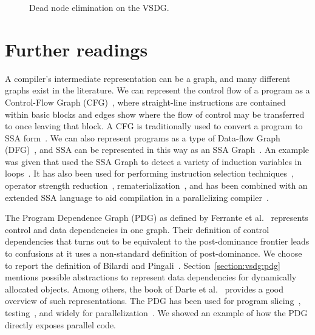{\begin{figure}[!ht]
\begin{minipage}[t]{5in}
\end{minipage}
\caption{Dead node elimination on the VSDG.}
\label{fig:dnevsdg}
\end{figure}

\section{Further readings}
A compiler's intermediate representation can be a graph, and many different graphs exist in the literature. 
We can represent the control flow of a program as a Control-Flow Graph (CFG)~\cite{808479}, where straight-line instructions are contained within basic blocks and edges show where the flow of control may be transferred to once leaving that block. 
A CFG is traditionally used to convert a program to SSA form~\cite{115320}. 
We can also represent programs as a type of Data-flow Graph (DFG)~\cite{dennis74first,dennis80data}, and SSA can be represented in this way as an SSA Graph~\cite{504710}. 
An example was given that used the SSA Graph to detect a variety of induction variables in loops~\cite{143131,201003}. 
It has also been used for performing instruction selection techniques~\cite{1375663,1269857}, operator strength reduction~\cite{504710}, rematerialization~\cite{143143}, and has been combined with an extended SSA language to aid compilation in a parallelizing compiler~\cite{Stoltz_extendedssa}.

The Program Dependence Graph (PDG) as defined by Ferrante et al.~\cite{ferrante87the} represents control and data dependencies in one graph. 
Their definition of control dependencies that turns out to be equivalent to the post-dominance frontier leads to confusions at it uses a non-standard definition of post-dominance. 
We choose to report the definition of Bilardi and Pingali~\cite{Bilardi1996}. 
Section~\ref{section:vsdg:pdg} mentions possible abstractions to represent data dependencies for dynamically allocated objects. 
Among others, the book of Darte et al.~\cite{DarteRV-book} provides a good overview of such representations. 
The PDG has been used for program slicing~\cite{ottenstein84program}, testing~\cite{bates93incremental}, and widely for parallelization~\cite{ferrante85on,ferrante88generating,simons90a,baxter89program}. 
We showed an example of how the PDG directly exposes parallel code.

}
